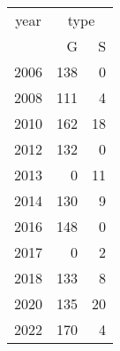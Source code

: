 \footnotesize\begin{tabular}[t]{lrr}
\toprule
\multicolumn{1}{c}{year} & \multicolumn{2}{c}{type} \\
\cmidrule(l{3pt}r{3pt}){1-1} \cmidrule(l{3pt}r{3pt}){2-3}
  & G & S\\
\midrule
2006 & 138 & 0\\
2008 & 111 & 4\\
2010 & 162 & 18\\
2012 & 132 & 0\\
2013 & 0 & 11\\
2014 & 130 & 9\\
2016 & 148 & 0\\
2017 & 0 & 2\\
2018 & 133 & 8\\
2020 & 135 & 20\\
2022 & 170 & 4\\
\bottomrule
\end{tabular}
